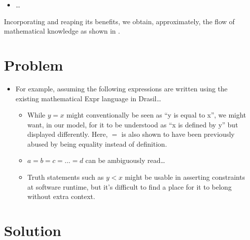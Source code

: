 \begin{itemize}

	\item \OthModel{} \ldots{}

\end{itemize}

Incorporating \ModelKinds{} and reaping its benefits, we obtain, approximately,
the flow of mathematical knowledge as shown in .

\theoriesWithModelKinds{}


\section{Problem}

\begin{itemize}

	\item For example, assuming the following expressions are written using the
	      existing mathematical Expr language in Drasil\ldots{}
	      \begin{itemize}

		      \item While \(y = x\) might conventionally be seen as ``y is equal
		            to x'', we might want, in our model, for it to be understood
		            as ``x is defined by y'' but displayed differently. Here,
		            \(=\) is also shown to have been previously abused by being
		            equality instead of definition.

		      \item \(a = b = c = ... = d\) can be ambiguously read\ldots{}

		      \item Truth statements such as \(y < x\) might be usable in
		            asserting constraints at software runtime, but it's
		            difficult to find a place for it to belong without extra
		            context.

	      \end{itemize}

\end{itemize}

\section{Solution}

